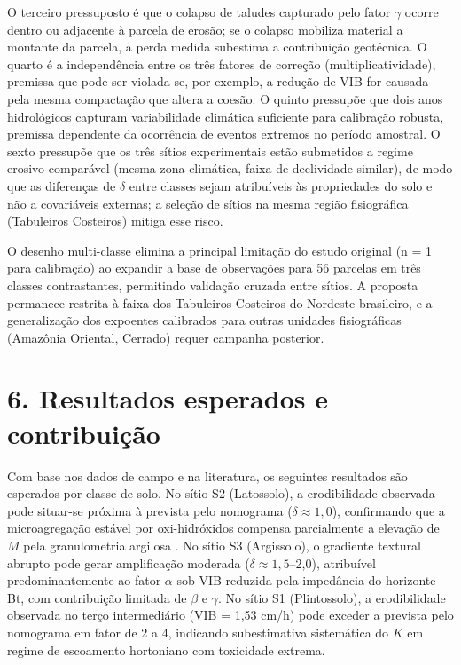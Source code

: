 \documentclass[
  brazilian,
  authoryear,
  preprint]{elsarticle}
\begin{document}
O terceiro pressuposto é que o colapso de taludes capturado pelo fator
\(\gamma\) ocorre dentro ou adjacente à parcela de erosão; se o colapso
mobiliza material a montante da parcela, a perda medida subestima a
contribuição geotécnica. O quarto é a independência entre os três
fatores de correção (multiplicatividade), premissa que pode ser violada
se, por exemplo, a redução de VIB for causada pela mesma compactação que
altera a coesão. O quinto pressupõe que dois anos hidrológicos capturam
variabilidade climática suficiente para calibração robusta, premissa
dependente da ocorrência de eventos extremos no período amostral. O
sexto pressupõe que os três sítios experimentais estão submetidos a
regime erosivo comparável (mesma zona climática, faixa de declividade
similar), de modo que as diferenças de \(\delta\) entre classes sejam
atribuíveis às propriedades do solo e não a covariáveis externas; a
seleção de sítios na mesma região fisiográfica (Tabuleiros Costeiros)
mitiga esse risco.

O desenho multi-classe elimina a principal limitação do estudo original
(n = 1 para calibração) ao expandir a base de observações para 56
parcelas em três classes contrastantes, permitindo validação cruzada
entre sítios. A proposta permanece restrita à faixa dos Tabuleiros
Costeiros do Nordeste brasileiro, e a generalização dos expoentes
calibrados para outras unidades fisiográficas (Amazônia Oriental,
Cerrado) requer campanha posterior.

\section{6. Resultados esperados e
contribuição}\label{resultados-esperados-e-contribuiuxe7uxe3o}

Com base nos dados de campo e na literatura, os seguintes resultados são
esperados por classe de solo. No sítio S2 (Latossolo), a erodibilidade
observada pode situar-se próxima à prevista pelo nomograma
(\(\delta \approx 1{,}0\)), confirmando que a microagregação estável por
oxi-hidróxidos compensa parcialmente a elevação de \(M\) pela
granulometria argilosa \citep{silva_et_al_2009}. No sítio S3
(Argissolo), o gradiente textural abrupto pode gerar amplificação
moderada (\(\delta \approx 1{,}5\)--2,0), atribuível predominantemente
ao fator \(\alpha\) sob VIB reduzida pela impedância do horizonte Bt,
com contribuição limitada de \(\beta\) e \(\gamma\). No sítio S1
(Plintossolo), a erodibilidade observada no terço intermediário (VIB =
1,53 cm/h) pode exceder a prevista pelo nomograma em fator de 2 a 4,
indicando subestimativa sistemática do \(K\) em regime de escoamento
hortoniano com toxicidade extrema.
\end{document}
